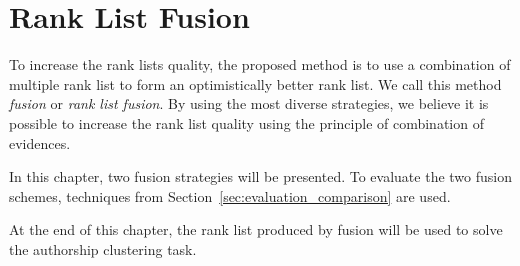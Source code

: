 \chapter{Rank List Fusion \label{sec:fusions}}

To increase the rank lists quality, the proposed method is to use a combination of multiple rank list to form an optimistically better rank list.
We call this method \textit{fusion} or \textit{rank list fusion}.
By using the most diverse strategies, we believe it is possible to increase the rank list quality using the principle of combination of evidences.

In this chapter, two fusion strategies will be presented.
To evaluate the two fusion schemes, techniques from Section~\ref{sec:evaluation_comparison} are used.

At the end of this chapter, the rank list produced by fusion will be used to solve the authorship clustering task.





